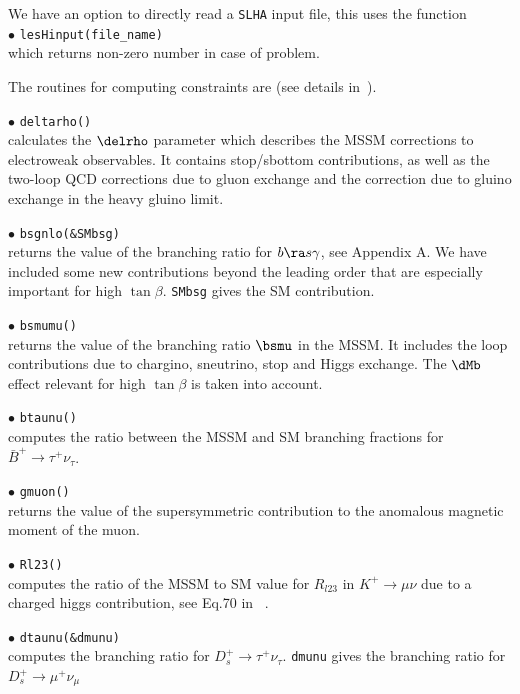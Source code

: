 \documentclass[12pt,a4paper]{article}
\begin{document}
We  have an option to directly read a {\tt SLHA}  input file, this uses the  function \\
\noi$\bullet$ \verb|lesHinput(file_name) |\\
which returns non-zero number in case of problem.

The routines for computing constraints are (see details
in~\cite{Belanger:2004yn}).

\noi$\bullet$ \verb|deltarho()|\\
 calculates  the $\delrho$ parameter which
describes the MSSM corrections to electroweak observables. It contains
stop/sbottom contributions, as well as the two-loop QCD
corrections due to gluon exchange and the correction due to gluino
exchange in the heavy gluino limit.

\noi$\bullet$ \verb|bsgnlo(&SMbsg)|\\ returns the value of the branching ratio for  $b\ra s\gamma$, see Appendix A. 
We have included some new contributions beyond the leading order that are
especially important for high $\tan\beta$. \verb|SMbsg| gives the SM contribution.

\noi$\bullet$ \verb|bsmumu()|\\ returns the value of the branching ratio $\bsmu$ in the
MSSM.
It includes the loop contributions
due to chargino, sneutrino, stop and Higgs exchange. The $\dMb$ 
effect relevant for high $\tan \beta$ is taken into account.

\noi$\bullet$ \verb|btaunu()|\\
computes the ratio between the MSSM and SM branching fractions for $\bar{B}^+\rightarrow\tau^+\nu_\tau$. 


\noi$\bullet$ \verb|gmuon()|\\
returns the value of the supersymmetric contribution to the
anomalous magnetic moment of the muon.

\noi$\bullet$ \verb|Rl23()|\\
computes the ratio of the MSSM to SM value for $R_{l23}$ in $K^+\rightarrow \mu\nu$  due to a  charged higgs contribution, see Eq.70 in ~\cite{Belanger:2013oya}. 

\noi$\bullet$ \verb|dtaunu(&dmunu)|\\
computes the branching ratio  for ${D}_s^+\rightarrow\tau^+\nu_\tau$. \verb|dmunu| 
gives  the branching ratio  for ${D}_s^+\rightarrow\mu^+\nu_\mu$
\end{document}
